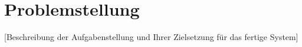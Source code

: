 \section{Problemstellung}

[Beschreibung der Aufgabenstellung und Ihrer Zielsetzung für das fertige System]
